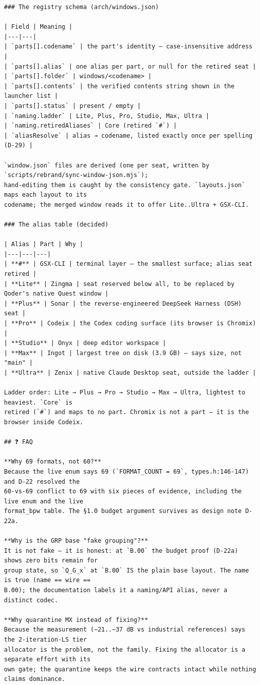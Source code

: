 \begin{Verbatim}[breaklines,breakanywhere,fontsize=\footnotesize]
### The registry schema (arch/windows.json)

| Field | Meaning |
|---|---|
| `parts[].codename` | the part's identity — case-insensitive address |
| `parts[].alias` | one alias per part, or null for the retired seat |
| `parts[].folder` | windows/<codename> |
| `parts[].contents` | the verified contents string shown in the launcher list |
| `parts[].status` | present / empty |
| `naming.ladder` | Lite, Plus, Pro, Studio, Max, Ultra |
| `naming.retiredAliases` | Core (retired `#`) |
| `aliasResolve` | alias → codename, listed exactly once per spelling (D-29) |

`window.json` files are derived (one per seat, written by `scripts/rebrand/sync-window-json.mjs`);
hand-editing them is caught by the consistency gate. `layouts.json` maps each layout to its
codename; the merged window reads it to offer Lite..Ultra + GSX-CLI.

### The alias table (decided)

| Alias | Part | Why |
|---|---|---|
| **#** | GSX-CLI | terminal layer — the smallest surface; alias seat retired |
| **Lite** | Zingma | seat reserved below all, to be replaced by Qoder's native Quest window |
| **Plus** | Sonar | the reverse-engineered DeepSeek Harness (DSH) seat |
| **Pro** | Codeix | the Codex coding surface (its browser is Chromix) |
| **Studio** | Onyx | deep editor workspace |
| **Max** | Ingot | largest tree on disk (3.9 GB) — says size, not "main" |
| **Ultra** | Zenix | native Claude Desktop seat, outside the ladder |

Ladder order: Lite → Plus → Pro → Studio → Max → Ultra, lightest to heaviest. `Core` is
retired (`#`) and maps to no part. Chromix is not a part — it is the browser inside Codeix.

## ❓ FAQ

**Why 69 formats, not 60?**
Because the live enum says 69 (`FORMAT_COUNT = 69`, types.h:146-147) and D-22 resolved the
60-vs-69 conflict to 69 with six pieces of evidence, including the live enum and the live
format_bpw table. The §1.0 budget argument survives as design note D-22a.

**Why is the GRP base "fake grouping"?**
It is not fake — it is honest: at `B.00` the budget proof (D-22a) shows zero bits remain for
group state, so `Q_G_x` at `B.00` IS the plain base layout. The name is true (name == wire ==
B.00); the documentation labels it a naming/API alias, never a distinct codec.

**Why quarantine MX instead of fixing?**
Because the measurement (−21..−37 dB vs industrial references) says the 2-iteration-LS tier
allocator is the problem, not the family. Fixing the allocator is a separate effort with its
own gate; the quarantine keeps the wire contracts intact while nothing claims dominance.


\end{Verbatim}

